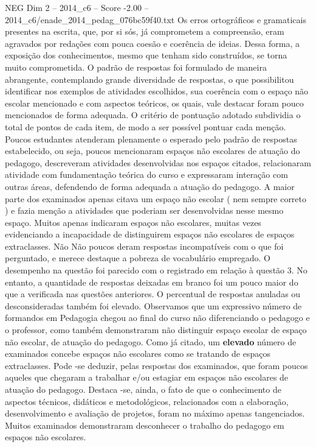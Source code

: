 \begin{textsample}{NEG Dim 2 – 2014\_c6 – Score -2.00 – 2014\_c6/enade\_2014\_pedag\_076bc59f40.txt}
Os erros ortográficos e gramaticais presentes na escrita, que, por si sós, já comprometem a compreensão, eram agravados por redações com pouca coesão e coerência de ideias.
Dessa forma, a exposição dos conhecimentos, mesmo que tenham sido construídos, se torna muito comprometida.
O padrão de respostas foi formulado de maneira abrangente, contemplando grande diversidade de respostas, o que possibilitou identificar nos exemplos de atividades escolhidos, sua coerência com o espaço não escolar mencionado e com aspectos teóricos, os quais, vale destacar foram pouco mencionados de forma adequada.
O critério de pontuação adotado subdividia o total de pontos de cada item, de modo a ser possível pontuar cada menção.
Poucos estudantes atenderam plenamente o esperado pelo padrão de respostas estabelecido, ou seja, poucos mencionaram espaços não escolares de atuação do pedagogo, descreveram atividades desenvolvidas nos espaços citados, relacionaram atividade com fundamentação teórica do curso e expressaram interação com outras áreas, defendendo de forma adequada a atuação do pedagogo.
A maior parte dos examinados apenas citava um espaço não escolar ( nem sempre correto ) e fazia menção a atividades que poderiam ser desenvolvidas nesse mesmo espaço.
Muitos apenas indicaram espaços não escolares, muitas vezes evidenciando a incapacidade de distinguirem espaços não escolares de espaços extraclasses.
Não Não poucos deram respostas incompatíveis com o que foi perguntado, e merece destaque a pobreza de vocabulário empregado.
O desempenho na questão foi parecido com o registrado em relação à questão 3.
No entanto, a quantidade de respostas deixadas em branco foi um pouco maior do que a verificada nas questões anteriores.
O percentual de respostas anuladas ou desconsideradas também foi elevado.
Observamos que um expressivo número de formandos em Pedagogia chegou ao final do curso não diferenciando o pedagogo e o professor, como também demonstraram não distinguir espaço escolar de espaço não escolar, de atuação do pedagogo.
Como já citado, um \textbf{elevado} número de examinados concebe espaços não escolares como se tratando de espaços extraclasses.
Pode -se deduzir, pelas respostas dos examinados, que foram poucos aqueles que chegaram a trabalhar e/ou estagiar em espaços não escolares de atuação do pedagogo.
Destaca -se, ainda, o fato de que o conhecimento de aspectos técnicos, didáticos e metodológicos, relacionados com a elaboração, desenvolvimento e avaliação de projetos, foram no máximo apenas tangenciados.
Muitos examinados demonstraram desconhecer o trabalho do pedagogo em espaços não escolares.

\end{textsample}
